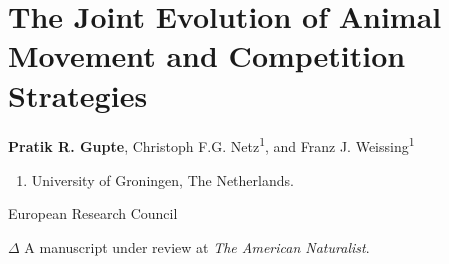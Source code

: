 
\chapter{The Joint Evolution of Animal Movement and Competition Strategies}\label{ch:kleptomove}

{\noindent \textbf{Pratik R. Gupte}, Christoph F.G. Netz\textsuperscript{1}, and Franz J. Weissing\textsuperscript{1}}

    \medskip

    {\color{Maroon}\normalsize{}}
    
    \begin{enumerate}
        \item University of Groningen, The Netherlands.
    \end{enumerate}
    
    \medskip

    {\color{Maroon}\normalsize{}}

    European Research Council

    \bigskip

    {\noindent \large{$\Delta$}} A manuscript under review at \textit{The American Naturalist}.


\clearpage
